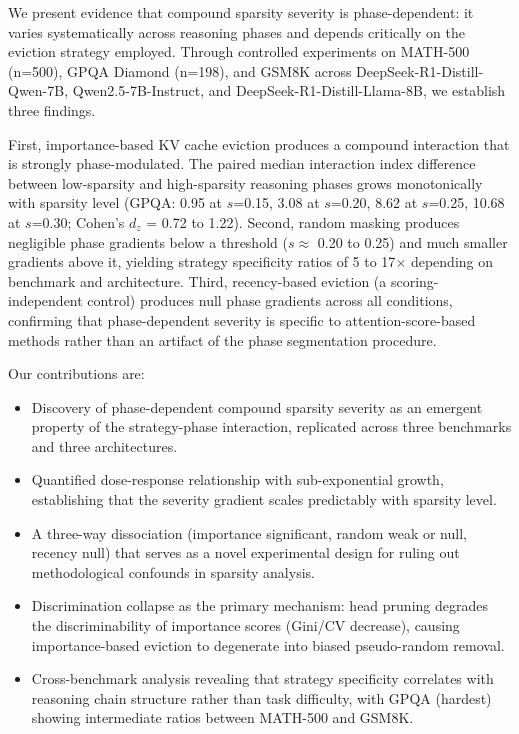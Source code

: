 \documentclass[11pt,a4paper]{article}
\begin{document}
We present evidence that compound sparsity severity is phase-dependent: it varies systematically across reasoning phases and depends critically on the eviction strategy employed. Through controlled experiments on MATH-500 (n=500), GPQA Diamond (n=198), and GSM8K across DeepSeek-R1-Distill-Qwen-7B, Qwen2.5-7B-Instruct, and DeepSeek-R1-Distill-Llama-8B, we establish three findings.

First, importance-based KV cache eviction produces a compound interaction that is strongly phase-modulated. The paired median interaction index difference between low-sparsity and high-sparsity reasoning phases grows monotonically with sparsity level (GPQA: 0.95 at $s$=0.15, 3.08 at $s$=0.20, 8.62 at $s$=0.25, 10.68 at $s$=0.30; Cohen's $d_z$ = 0.72 to 1.22). Second, random masking produces negligible phase gradients below a threshold ($s \approx$ 0.20 to 0.25) and much smaller gradients above it, yielding strategy specificity ratios of 5 to 17$\times$ depending on benchmark and architecture. Third, recency-based eviction (a scoring-independent control) produces null phase gradients across all conditions, confirming that phase-dependent severity is specific to attention-score-based methods rather than an artifact of the phase segmentation procedure.

Our contributions are:
\begin{itemize}[nosep]
\item Discovery of phase-dependent compound sparsity severity as an emergent property of the strategy-phase interaction, replicated across three benchmarks and three architectures.
\item Quantified dose-response relationship with sub-exponential growth, establishing that the severity gradient scales predictably with sparsity level.
\item A three-way dissociation (importance significant, random weak or null, recency null) that serves as a novel experimental design for ruling out methodological confounds in sparsity analysis.
\item Discrimination collapse as the primary mechanism: head pruning degrades the discriminability of importance scores (Gini/CV decrease), causing importance-based eviction to degenerate into biased pseudo-random removal.
\item Cross-benchmark analysis revealing that strategy specificity correlates with reasoning chain structure rather than task difficulty, with GPQA (hardest) showing intermediate ratios between MATH-500 and GSM8K.
\end{itemize}
\end{document}
